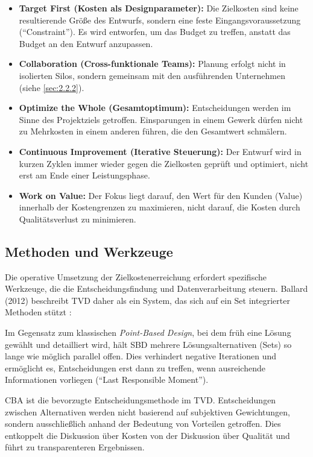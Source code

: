 \begin{itemize}
    \item \textbf{Target First (Kosten als Designparameter):} Die Zielkosten sind keine resultierende Größe des Entwurfs, sondern eine feste Eingangsvoraussetzung (\enquote{Constraint}). Es wird entworfen, um das Budget zu treffen, anstatt das Budget an den Entwurf anzupassen.
    \item \textbf{Collaboration (Cross-funktionale Teams):} Planung erfolgt nicht in isolierten Silos, sondern gemeinsam mit den ausführenden Unternehmen (siehe \cref{sec:2.2.2}).
    \item \textbf{Optimize the Whole (Gesamtoptimum):} Entscheidungen werden im Sinne des Projektziels getroffen. Einsparungen in einem Gewerk dürfen nicht zu Mehrkosten in einem anderen führen, die den Gesamtwert schmälern.
    \item \textbf{Continuous Improvement (Iterative Steuerung):} Der Entwurf wird in kurzen Zyklen immer wieder gegen die Zielkosten geprüft und optimiert, nicht erst am Ende einer Leistungsphase.
    \item \textbf{Work on Value:} Der Fokus liegt darauf, den Wert für den Kunden (Value) innerhalb der Kostengrenzen zu maximieren, nicht darauf, die Kosten durch Qualitätsverlust zu minimieren.
\end{itemize}

\subsection{Methoden und Werkzeuge}
\label{sec:2.3.4}

Die operative Umsetzung der Zielkostenerreichung erfordert spezifische Werkzeuge, die die Entscheidungsfindung und Datenverarbeitung steuern. Ballard (2012) beschreibt \acs{TVD} daher als ein System, das sich auf ein Set integrierter Methoden stützt \autocite[Vgl.][S.~55]{hill_target_2017}:

Im Gegensatz zum klassischen \textit{Point-Based Design}, bei dem früh eine Lösung gewählt und detailliert wird, hält SBD mehrere Lösungsalternativen (Sets) so lange wie möglich parallel offen. Dies verhindert negative Iterationen und ermöglicht es, Entscheidungen erst dann zu treffen, wenn ausreichende Informationen vorliegen (\enquote{Last Responsible Moment}).\autocite[Vgl.][S.~9--12]{tommelein_target_2016}

\acs{CBA} ist die bevorzugte Entscheidungsmethode im \acs{TVD}. Entscheidungen zwischen Alternativen werden nicht basierend auf subjektiven Gewichtungen, sondern ausschließlich anhand der Bedeutung von Vorteilen getroffen. Dies entkoppelt die Diskussion über Kosten von der Diskussion über Qualität und führt zu transparenteren Ergebnissen.\autocite[Vgl.][S.~27--31]{hill_target_2017}


